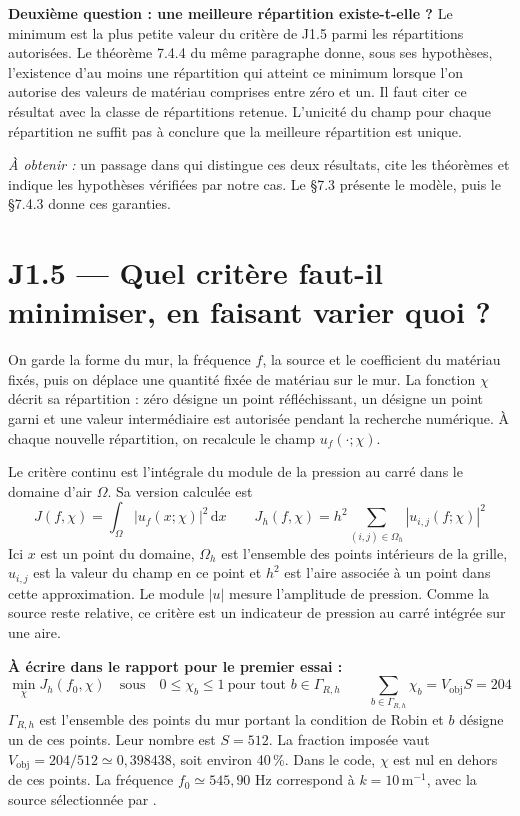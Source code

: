 \documentclass[10pt,a4paper]{article}
\newcommand{\code}[1]{\texttt{\detokenize{#1}}}
\begin{document}
\textbf{Deuxième question : une meilleure répartition existe-t-elle ?} Le minimum est la plus petite valeur du critère de J1.5 parmi les répartitions autorisées. Le théorème 7.4.4 du même paragraphe donne, sous ses hypothèses, l'existence d'au moins une répartition qui atteint ce minimum lorsque l'on autorise des valeurs de matériau comprises entre zéro et un. Il faut citer ce résultat avec la classe de répartitions retenue. L'unicité du champ pour chaque répartition ne suffit pas à conclure que la meilleure répartition est unique.

\emph{À obtenir :} un passage dans \code{report/report.tex} qui distingue ces deux résultats, cite les théorèmes et indique les hypothèses vérifiées par notre cas. Le §7.3 présente le modèle, puis le §7.4.3 donne ces garanties.

\section*{J1.5 --- Quel critère faut-il minimiser, en faisant varier quoi ?}
On garde la forme du mur, la fréquence $f$, la source et le coefficient du matériau fixés, puis on déplace une quantité fixée de matériau sur le mur. La fonction $\chi$ décrit sa répartition : zéro désigne un point réfléchissant, un désigne un point garni et une valeur intermédiaire est autorisée pendant la recherche numérique. À chaque nouvelle répartition, on recalcule le champ $u_f(\cdot;\chi)$.

Le critère continu est l'intégrale du module de la pression au carré dans le domaine d'air $\Omega$. Sa version calculée est
\begin{equation*}
J(f,\chi)=\int_\Omega |u_f(x;\chi)|^2\,\mathrm{d}x
\qquad
J_h(f,\chi)=h^2\sum_{(i,j)\in\Omega_h}|u_{i,j}(f;\chi)|^2
\end{equation*}
Ici $x$ est un point du domaine, $\Omega_h$ est l'ensemble des points intérieurs de la grille, $u_{i,j}$ est la valeur du champ en ce point et $h^2$ est l'aire associée à un point dans cette approximation. Le module $|u|$ mesure l'amplitude de pression. Comme la source reste relative, ce critère est un indicateur de pression au carré intégrée sur une aire.

\textbf{À écrire dans le rapport pour le premier essai :}
\begin{equation*}
\min_{\chi} J_h(f_0,\chi)
\quad\text{sous}\quad
0\leq\chi_b\leq1\ \text{pour tout }b\in\Gamma_{R,h}
\qquad
\sum_{b\in\Gamma_{R,h}}\chi_b=V_{\mathrm{obj}}S=204
\end{equation*}
$\Gamma_{R,h}$ est l'ensemble des points du mur portant la condition de Robin et $b$ désigne un de ces points. Leur nombre est $S=512$. La fraction imposée vaut $V_{\mathrm{obj}}=204/512\simeq0,398438$, soit environ 40\,\%. Dans le code, $\chi$ est nul en dehors de ces points. La fréquence $f_0\simeq545,90$ Hz correspond à $k=10\,\mathrm{m^{-1}}$, avec la source sélectionnée par \code{SOURCE}.
\end{document}

